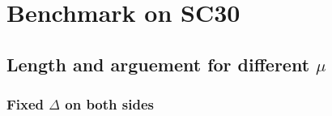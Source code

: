 \documentclass[../main.tex]{subfiles}
\begin{document}
\section{Benchmark on SC30}
%         
%         
%         

\subsection{Length and arguement for different $\mu$}
\subsubsection{Fixed $\Delta$ on both sides}
\end{document}
